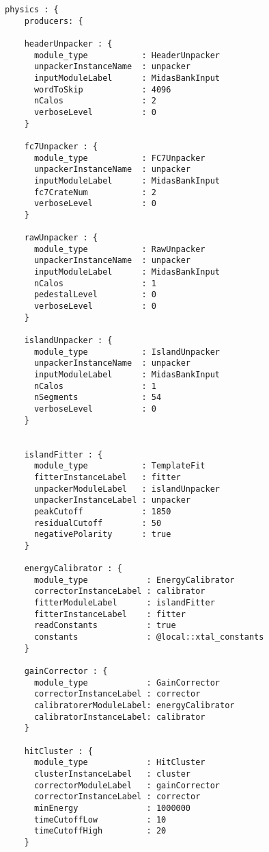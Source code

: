 \begin{Verbatim}[frame=single]
physics : {
    producers: {

    headerUnpacker : {
      module_type           : HeaderUnpacker
      unpackerInstanceName  : unpacker
      inputModuleLabel      : MidasBankInput
      wordToSkip            : 4096
      nCalos                : 2
      verboseLevel          : 0
	}

    fc7Unpacker : {
      module_type           : FC7Unpacker
      unpackerInstanceName  : unpacker
      inputModuleLabel      : MidasBankInput
      fc7CrateNum           : 2
      verboseLevel          : 0
	}
    
    rawUnpacker : {
      module_type           : RawUnpacker
      unpackerInstanceName  : unpacker
      inputModuleLabel      : MidasBankInput
      nCalos                : 1
      pedestalLevel         : 0
      verboseLevel          : 0
	}

    islandUnpacker : {
      module_type           : IslandUnpacker
      unpackerInstanceName  : unpacker
      inputModuleLabel      : MidasBankInput
      nCalos                : 1
      nSegments             : 54
      verboseLevel          : 0 
	}


    islandFitter : {
      module_type           : TemplateFit
      fitterInstanceLabel   : fitter
      unpackerModuleLabel   : islandUnpacker
      unpackerInstanceLabel : unpacker
      peakCutoff            : 1850    
      residualCutoff        : 50
      negativePolarity      : true
	} 

    energyCalibrator : {
      module_type            : EnergyCalibrator
      correctorInstanceLabel : calibrator
      fitterModuleLabel      : islandFitter 
      fitterInstanceLabel    : fitter
      readConstants          : true
      constants              : @local::xtal_constants
	}

    gainCorrector : {
      module_type            : GainCorrector
      correctorInstanceLabel : corrector
      calibratorerModuleLabel: energyCalibrator 
      calibratorInstanceLabel: calibrator
	}

    hitCluster : {
      module_type            : HitCluster
      clusterInstanceLabel   : cluster
      correctorModuleLabel   : gainCorrector
      correctorInstanceLabel : corrector
      minEnergy              : 1000000        
      timeCutoffLow          : 10
      timeCutoffHigh         : 20
	}
\end{Verbatim}

